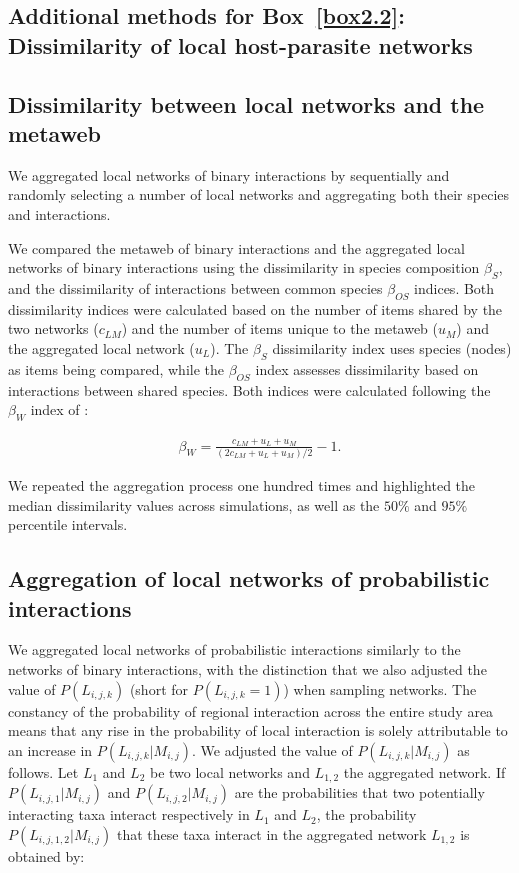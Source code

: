 \begin{refsection}
\section{Additional methods for Box~\ref{box2.2}: Dissimilarity of local host-parasite networks}

\subsection{Dissimilarity between local networks and the metaweb}

We aggregated local networks of binary interactions by sequentially and randomly
selecting a number of local networks and aggregating both their species and
interactions. 

We compared the metaweb of binary interactions and the aggregated local networks
of binary interactions using the dissimilarity in species composition
$\beta_{S}$, and the dissimilarity of interactions between common species
$\beta_{OS}$ indices. Both dissimilarity indices were calculated based on the
number of items shared by the two networks ($c_{LM}$) and the number of items
unique to the metaweb ($u_M$) and the aggregated local network ($u_L$). The
$\beta_{S}$ dissimilarity index uses species (nodes) as items being compared,
while the $\beta_{OS}$ index assesses dissimilarity based on interactions
between shared species. Both indices were calculated following the $\beta_W$
index of \textcite{Whittaker1960Vegetation}: 

\begin{eqnarray}
    \label{eq:betadiv_network}
    \beta_W = \frac{c_{LM} + u_L + u_M}{(2 c_{LM} + u_L + u_M) / 2} - 1.
\end{eqnarray}

We repeated the aggregation process one hundred times and highlighted the median
dissimilarity values across simulations, as well as the $50\%$ and $95\%$
percentile intervals. 

\subsection{Aggregation of local networks of probabilistic interactions}

We aggregated local networks of probabilistic interactions similarly to the
networks of binary interactions, with the distinction that we also adjusted the
value of $P(L_{i, j, k})$ (short for $P(L_{i, j, k} = 1)$) when sampling
networks. The constancy of the probability of regional interaction across the
entire study area means that any rise in the probability of local interaction is
solely attributable to an increase in $P(L_{i, j, k}|M_{i, j})$. We adjusted the
value of $P(L_{i, j, k}|M_{i, j})$ as follows. Let $L_1$ and $L_2$ be two local
networks and $L_{1,2}$ the aggregated network. If $P(L_{i, j, 1}|M_{i, j})$ and
$P(L_{i, j, 2}|M_{i, j})$ are the probabilities that two potentially interacting
taxa interact respectively in $L_1$ and $L_2$, the probability $P(L_{i, j,
1,2}|M_{i, j})$ that these taxa interact in the aggregated network $L_{1,2}$ is
obtained by: 


\end{refsection}
